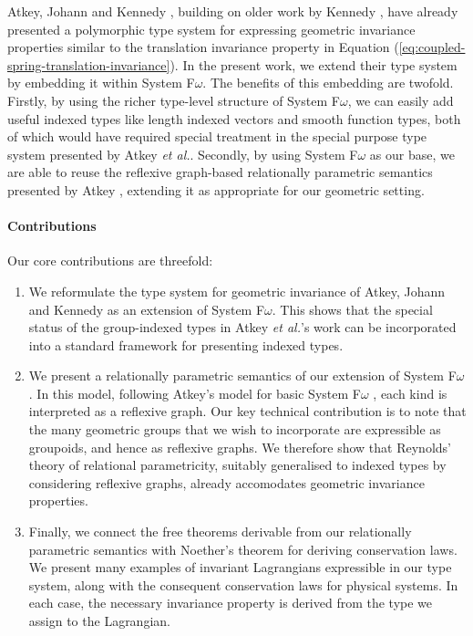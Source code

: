 \documentclass[preprint]{sigplanconf}
\theoremstyle{examplestyle}
\begin{document}
Atkey, Johann and Kennedy \cite{atkey13abstraction}, building on older
work by Kennedy \cite{kennedy97relational}, have already presented a
polymorphic type system for expressing geometric invariance properties
similar to the translation invariance property in Equation
(\ref{eq:coupled-spring-translation-invariance}). In the present work,
we extend their type system by embedding it within System
F$\omega$. The benefits of this embedding are twofold. Firstly, by
using the richer type-level structure of System F$\omega$, we can
easily add useful indexed types like length indexed vectors and smooth
function types, both of which would have required special treatment in
the special purpose type system presented by Atkey \emph{et
  al.}. Secondly, by using System F$\omega$ as our base, we are able
to reuse the reflexive graph-based relationally parametric semantics
presented by Atkey \cite{atkey12relational}, extending it as
appropriate for our geometric setting.

\paragraph{Contributions}

Our core contributions are threefold:
\begin{enumerate}
\item We reformulate the type system for geometric invariance of
  Atkey, Johann and Kennedy \cite{atkey13abstraction} as an extension
  of System F$\omega$. This shows that the special status of the
  group-indexed types in Atkey \emph{et al.}'s work can be
  incorporated into a standard framework for presenting indexed types.
\item We present a relationally parametric semantics of our extension
  of System F$\omega$. In this model, following Atkey's model for
  basic System F$\omega$ \cite{atkey12relational}, each kind is
  interpreted as a reflexive graph. Our key technical contribution is
  to note that the many geometric groups that we wish to incorporate
  are expressible as groupoids, and hence as reflexive graphs. We
  therefore show that Reynolds' theory of relational parametricity,
  suitably generalised to indexed types by considering reflexive
  graphs, already accomodates geometric invariance properties.
\item Finally, we connect the free theorems derivable from our
  relationally parametric semantics with Noether's theorem for
  deriving conservation laws. We present many examples of invariant
  Lagrangians expressible in our type system, along with the
  consequent conservation laws for physical systems. In each case, the
  necessary invariance property is derived from the type we assign to
  the Lagrangian.
\end{enumerate}
\end{document}
